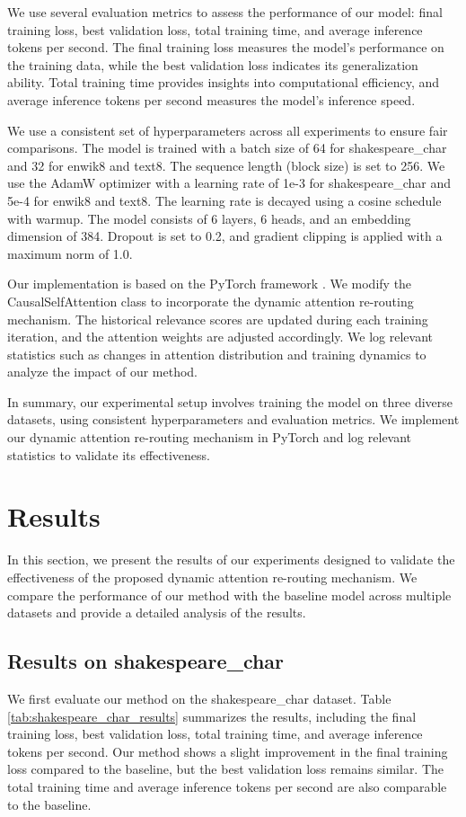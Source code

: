 \documentclass{article} %
\begin{document}
We use several evaluation metrics to assess the performance of our model: final training loss, best validation loss, total training time, and average inference tokens per second. The final training loss measures the model's performance on the training data, while the best validation loss indicates its generalization ability. Total training time provides insights into computational efficiency, and average inference tokens per second measures the model's inference speed.

We use a consistent set of hyperparameters across all experiments to ensure fair comparisons. The model is trained with a batch size of 64 for shakespeare\_char and 32 for enwik8 and text8. The sequence length (block size) is set to 256. We use the AdamW optimizer \cite{loshchilov2017adamw} with a learning rate of 1e-3 for shakespeare\_char and 5e-4 for enwik8 and text8. The learning rate is decayed using a cosine schedule with warmup. The model consists of 6 layers, 6 heads, and an embedding dimension of 384. Dropout is set to 0.2, and gradient clipping is applied with a maximum norm of 1.0.

Our implementation is based on the PyTorch framework \cite{paszke2019pytorch}. We modify the CausalSelfAttention class to incorporate the dynamic attention re-routing mechanism. The historical relevance scores are updated during each training iteration, and the attention weights are adjusted accordingly. We log relevant statistics such as changes in attention distribution and training dynamics to analyze the impact of our method.

In summary, our experimental setup involves training the model on three diverse datasets, using consistent hyperparameters and evaluation metrics. We implement our dynamic attention re-routing mechanism in PyTorch and log relevant statistics to validate its effectiveness.

\section{Results}
\label{sec:results}

In this section, we present the results of our experiments designed to validate the effectiveness of the proposed dynamic attention re-routing mechanism. We compare the performance of our method with the baseline model across multiple datasets and provide a detailed analysis of the results.

\subsection{Results on shakespeare\_char}
We first evaluate our method on the shakespeare\_char dataset. Table \ref{tab:shakespeare_char_results} summarizes the results, including the final training loss, best validation loss, total training time, and average inference tokens per second. Our method shows a slight improvement in the final training loss compared to the baseline, but the best validation loss remains similar. The total training time and average inference tokens per second are also comparable to the baseline.
\end{document}
